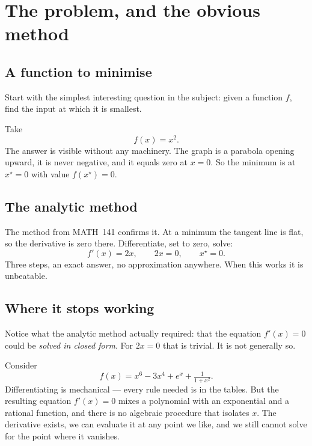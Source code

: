 \documentclass[11pt]{article}
\theoremstyle{plain}
\theoremstyle{definition}
\theoremstyle{remark}
\begin{document}
\section{The problem, and the obvious method}

\subsection{A function to minimise}
Start with the simplest interesting question in the subject: given a function
$f$, find the input at which it is smallest.

Take
\[
  f(x) = x^{2} .
\]
The answer is visible without any machinery. The graph is a parabola opening
upward, it is never negative, and it equals zero at $x=0$. So the minimum is at
$x^{\star}=0$ with value $f(x^{\star})=0$.

\subsection{The analytic method}
The method from MATH~141 confirms it. At a minimum the tangent line is flat, so
the derivative is zero there. Differentiate, set to zero, solve:
\[
  f'(x) = 2x,
  \qquad
  2x = 0,
  \qquad
  x^{\star} = 0 .
\]
Three steps, an exact answer, no approximation anywhere. When this works it is
unbeatable.

\subsection{Where it stops working}
Notice what the analytic method actually required: that the equation $f'(x)=0$
could be \emph{solved in closed form}. For $2x=0$ that is trivial. It is not
generally so.

Consider
\[
  f(x) = x^{6} - 3x^{4} + e^{x} + \tfrac{1}{1+x^{2}} .
\]
Differentiating is mechanical --- every rule needed is in the tables. But the
resulting equation $f'(x)=0$ mixes a polynomial with an exponential and a
rational function, and there is no algebraic procedure that isolates $x$. The
derivative exists, we can evaluate it at any point we like, and we still cannot
solve for the point where it vanishes.
\end{document}
